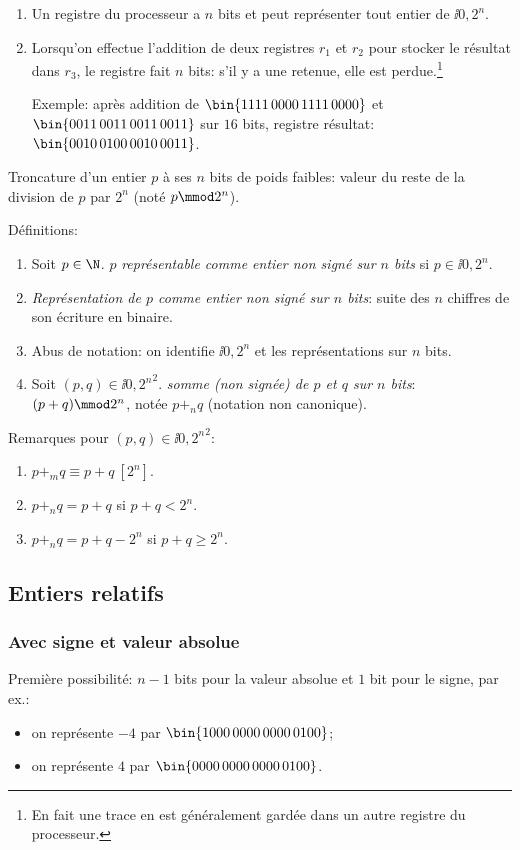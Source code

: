 \begin{enumerate}
\item Un registre du processeur a $n$ bits et peut
  représenter tout entier de $\ii{0,2^{n}}$.
\item Lorsqu'on effectue l'addition de deux registres $r_{1}$ et
  $r_{2}$ pour stocker le résultat dans $r_{3}$, le registre fait $n$
  bits: s'il y a une retenue, elle est perdue.\footnote{En fait une
    trace en est généralement gardée dans un autre registre du
    processeur.}

  Exemple: après addition de $\bin{1111\,0000\,1111\,0000}$ et
  $\bin{0011\,0011\,0011\,0011}$ sur $16$ bits, registre résultat:
  $\bin{0010\,0100\,0010\,0011}$.
\end{enumerate}

Troncature d'un entier $p$ à ses $n$ bits de poids faibles: valeur du
reste de la division de $p$ par $2^{n}$ (noté $p \mmod 2^{n}$).

Définitions:
\begin{enumerate}
\item Soit $p\in\N$. $p$ \emph{représentable comme
    entier non signé sur $n$ bits} si $p\in\ii{0,2^{n}}$.
\item \emph{Représentation de $p$ comme entier non signé sur $n$
    bits}:
  suite des $n$ chiffres de son écriture en binaire.
\item Abus de notation: on identifie $\ii{0,2^{n}}$ et les
  représentations sur $n$ bits.
\item Soit $(p,q)\in \ii{0,2^{n}}^{2}$.
  \emph{somme (non signée) de $p$ et $q$ sur $n$ bits}: $(p+q) \mmod
  2^{n}$, notée $p+_{n}q$ (notation non canonique).
\end{enumerate}

Remarques pour $(p,q)\in \ii{0,2^{n}}^{2}$:
  \begin{enumerate}
  \item $p+_{m}q \equiv p+q\ [2^{n}]$.
  \item $p+_{n}q = p+q$ si $p+q< 2^{n}$.
  \item $p+_{n}q = p+q - 2^{n}$ si $p+q \geq 2^{n}$.
  \end{enumerate}
\subsection*{Entiers relatifs}

\subsubsection*{Avec signe et valeur absolue}
Première possibilité: $n-1$ bits pour la valeur absolue et
$1$ bit pour le signe, par ex.:
\begin{itemize}
\item on représente $-4$ par $\bin{1000\,0000\,0000\,0100}$;
\item on représente $4$ par $\bin{0000\,0000\,0000\,0100}$.
\end{itemize}

